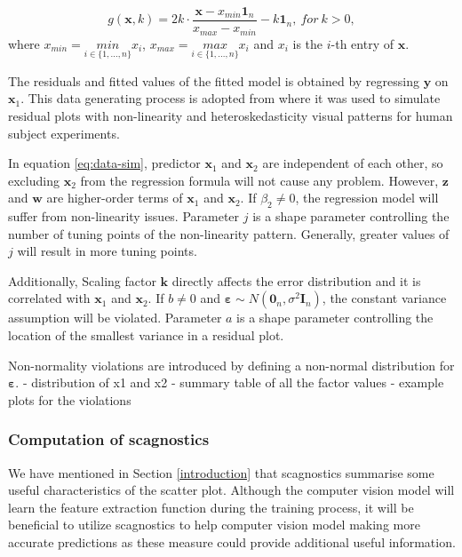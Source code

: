 \documentclass[]{interact}
\theoremstyle{plain}%
\theoremstyle{definition}
\theoremstyle{remark}
\begin{document}
\[g(\boldsymbol{x}, k) = 2k \cdot \frac{\boldsymbol{x} - x_{min}\boldsymbol{1}_n}{x_{max} - x_{min}} - k\boldsymbol{1}_n,~for~k > 0,\]
\noindent where \(x_{min} = \underset{i \in \{ 1,...,n\}}{min} x_i\),
\(x_{max} = \underset{i \in \{ 1,...,n\}}{max} x_i\) and \(x_i\) is the
\(i\)-th entry of \(\boldsymbol{x}\).

The residuals and fitted values of the fitted model is obtained by
regressing \(\boldsymbol{y}\) on \(\boldsymbol{x}_1\). This data
generating process is adopted from \citet{li2023plot} where it was used
to simulate residual plots with non-linearity and heteroskedasticity
visual patterns for human subject experiments.

In equation \ref{eq:data-sim}, predictor \(\boldsymbol{x}_1\) and
\(\boldsymbol{x}_2\) are independent of each other, so excluding
\(\boldsymbol{x}_2\) from the regression formula will not cause any
problem. However, \(\boldsymbol{z}\) and \(\boldsymbol{w}\) are
higher-order terms of \(\boldsymbol{x}_1\) and \(\boldsymbol{x}_2\). If
\(\beta_2 \neq 0\), the regression model will suffer from non-linearity
issues. Parameter \(j\) is a shape parameter controlling the number of
tuning points of the non-linearity pattern. Generally, greater values of
\(j\) will result in more tuning points.

Additionally, Scaling factor \(\boldsymbol{k}\) directly affects the
error distribution and it is correlated with \(\boldsymbol{x}_1\) and
\(\boldsymbol{x}_2\). If \(b \neq 0\) and
\(\boldsymbol{\varepsilon} \sim N(\boldsymbol{0}_n, \sigma^2\boldsymbol{I}_n)\),
the constant variance assumption will be violated. Parameter \(a\) is a
shape parameter controlling the location of the smallest variance in a
residual plot.

Non-normality violations are introduced by defining a non-normal
distribution for \(\boldsymbol{\varepsilon}\). - distribution of x1 and
x2 - summary table of all the factor values - example plots for the
violations

\hypertarget{computation-of-scagnostics}{%
\subsubsection{Computation of
scagnostics}\label{computation-of-scagnostics}}

We have mentioned in Section \ref{introduction} that scagnostics
summarise some useful characteristics of the scatter plot. Although the
computer vision model will learn the feature extraction function during
the training process, it will be beneficial to utilize scagnostics to
help computer vision model making more accurate predictions as these
measure could provide additional useful information.
\end{document}
